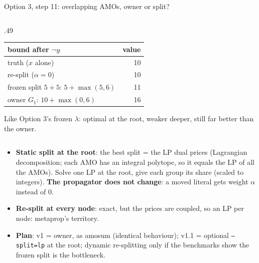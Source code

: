\documentclass[aspectratio=169,11pt]{beamer}
\begin{document}
\begin{frame}{Option 3, step 11: overlapping AMOs, owner or split?}
\begin{columns}[T]
\begin{column}{.49\textwidth}
\begin{center}
\begin{tabular}{lr}\toprule
bound after $\neg y$ & value\\\midrule
truth ($x$ alone) & 10\\
re-split ($\alpha = 0$) & 10\\
frozen split $5 + 5$: $5 + \max(5, 6)$ & 11\\
owner $G_1$: $10 + \max(0, 6)$ & 16\\\bottomrule
\end{tabular}
\end{center}
Like Option 3's frozen $\lambda$: optimal at the root, weaker deeper, still far better than the owner.
\end{column}
\end{columns}
\vspace{1mm}
\begin{itemize}\setlength\itemsep{1pt}
\item \textbf{Static split at the root}: the best split = the LP dual prices (Lagrangian decomposition; each AMO has an
  integral polytope, so it equals the LP of all the AMOs). Solve one LP at the root, give each group its share (scaled to
  integers). \textbf{The propagator does not change}: a moved literal gets weight $\alpha$ instead of 0.
\item \textbf{Re-split at every node}: exact, but the prices are coupled, so an LP per node: metaprop's territory.
\item \textbf{Plan}: v1 = owner, as amosum (identical behaviour); v1.1 = optional \texttt{--split=lp} at the root; dynamic
  re-splitting only if the benchmarks show the frozen split is the bottleneck.
\end{itemize}
\end{frame}
\end{document}
